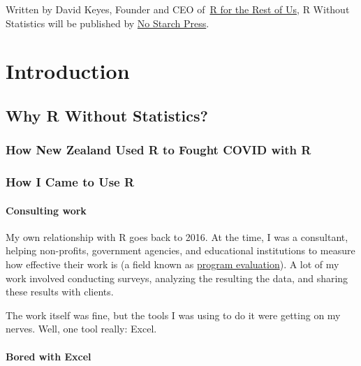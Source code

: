 \documentclass[
]{book}
\begin{document}
Written by David Keyes, Founder and CEO of~\href{https://rfortherestofus.com/}{R for the Rest of Us}, R Without Statistics will be published by \href{https://nostarch.com/}{No Starch Press}.

\hypertarget{part-introduction}{%
\part*{Introduction}\label{part-introduction}}

\hypertarget{why-r-without-statistics}{%
\chapter*{Why R Without Statistics?}\label{why-r-without-statistics}}

\hypertarget{how-new-zealand-used-r-to-fought-covid-with-r}{%
\section{How New Zealand Used R to Fought COVID with R}\label{how-new-zealand-used-r-to-fought-covid-with-r}}

\hypertarget{how-i-came-to-use-r}{%
\section{How I Came to Use R}\label{how-i-came-to-use-r}}

\hypertarget{consulting-work}{%
\subsection{Consulting work}\label{consulting-work}}

My own relationship with R goes back to 2016. At the time, I was a consultant, helping non-profits, government agencies, and educational institutions to measure how effective their work is (a field known as \href{https://www.cdc.gov/evaluation/index.htm}{program evaluation}). A lot of my work involved conducting surveys, analyzing the resulting the data, and sharing these results with clients.

The work itself was fine, but the tools I was using to do it were getting on my nerves. Well, one tool really: Excel.

\hypertarget{bored-with-excel}{%
\subsection{Bored with Excel}\label{bored-with-excel}}
\end{document}
